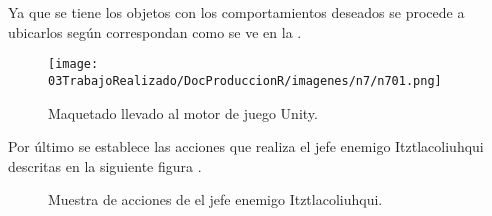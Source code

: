 Ya que se tiene los objetos con los comportamientos deseados se procede a ubicarlos según correspondan como se ve en la \cite{fig:n704}.
\begin{figure}
	\centering
	\caption{Maquetado llevado al motor de juego Unity.}
	\label{fig:n704}
	\texttt{[image: 03TrabajoRealizado/DocProduccionR/imagenes/n7/n701.png]}
\end{figure}

Por último se establece las acciones que realiza el jefe enemigo Itztlacoliuhqui descritas en la siguiente figura \cite{fig:n705}.
\begin{figure}[htbp]
	\centering
	\caption{Muestra de acciones de el jefe enemigo Itztlacoliuhqui. } \label{fig:n705}
\end{figure}
